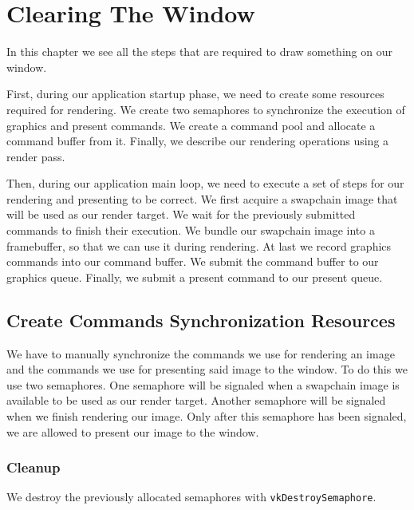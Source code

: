 \chapter{Clearing The Window}

In this chapter we see all the steps that are required to draw something
on our window.

First, during our application startup phase, we need to create some resources
required for rendering.
We create two semaphores to synchronize the execution of graphics and present
commands.
We create a command pool and allocate a command buffer from it.
Finally, we describe our rendering operations using a render pass.

Then, during our application main loop, we need to execute a set of steps
for our rendering and presenting to be correct.
We first acquire a swapchain image that will be used as our render target.
We wait for the previously submitted commands to finish their execution.
We bundle our swapchain image into a framebuffer, so that we can use it
during rendering.
At last we record graphics commands into our command buffer.
We submit the command buffer to our graphics queue.
Finally, we submit a present command to our present queue.

\section{Create Commands Synchronization Resources}

We have to manually synchronize the commands we use for rendering an image
and the commands we use for presenting said image to the window.
To do this we use two semaphores.
One semaphore will be signaled when a swapchain image is available to
be used as our render target.
Another semaphore will be signaled when we finish rendering our image.
Only after this semaphore has been signaled, we are allowed to present our
image to the window.

\begin{minipage}{\linewidth}{\noindent}
    
\end{minipage}

\subsection{Cleanup}

We destroy the previously allocated semaphores with \texttt{vkDestroySemaphore}.

